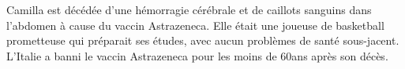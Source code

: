 Camilla est décédée d'une hémorragie cérébrale et de caillots sanguins dans
l'abdomen à cause du vaccin Astrazeneca. Elle était une joueuse de basketball
prometteuse qui préparait ses études, avec aucun problèmes de santé
sous-jacent. L'Italie a banni le vaccin Astrazeneca pour les moins de 60ans
après son décès.


